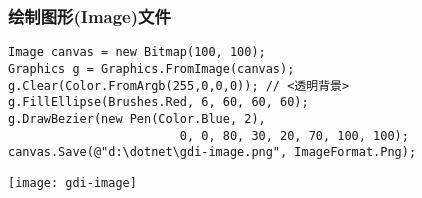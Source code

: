 \begin{frame}[fragile]
\frametitle{绘制图形(Image)文件}
\begin{lstlisting}[escapeinside=<>]
Image canvas = new Bitmap(100, 100);
Graphics g = Graphics.FromImage(canvas);
g.Clear(Color.FromArgb(255,0,0,0)); // <透明背景>
g.FillEllipse(Brushes.Red, 6, 60, 60, 60);
g.DrawBezier(new Pen(Color.Blue, 2),
                        0, 0, 80, 30, 20, 70, 100, 100);
canvas.Save(@"d:\dotnet\gdi-image.png", ImageFormat.Png);
\end{lstlisting}
\texttt{[image: gdi-image]}
\end{frame}







